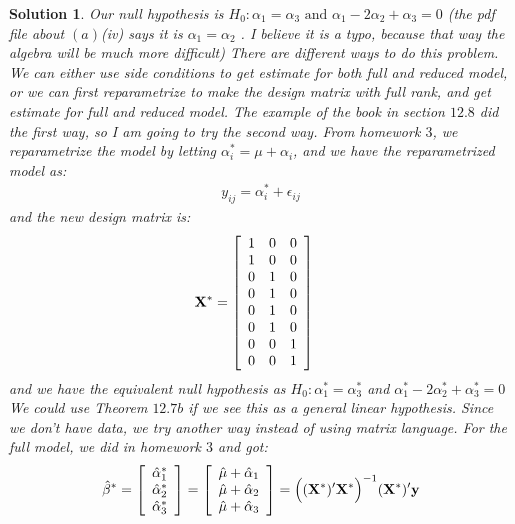\documentclass[11pt]{article}
\newtheorem{sol}{Solution}
\begin{document}
\begin{sol}
	Our null hypothesis is $H_0: \alpha_1 = \alpha_3 \text{ and }\alpha_1 - 2\alpha_2 + \alpha_3= 0$ (the pdf file about $(a)$(iv) says it is $\alpha_1 = \alpha_2$ . I believe it is a typo, because that way the algebra will be much more difficult)\vskip 2mm
	There are different ways to do this problem. We can either use side conditions to get estimate for both full and reduced model, or we can first reparametrize to make the design matrix with full rank, and get estimate for full and reduced model.\vskip 2mm
	The example of the book in section $12.8$ did the first way, so I am going to try the second way.\vskip 2mm
	From homework $3$, we reparametrize the model by letting $\alpha_i^{\ast} = \mu + \alpha_i$, and we have the reparametrized model as:
	\begin{align*}
		y_{ij} = \alpha_i^{\ast} + \epsilon_{ij}
	\end{align*}
	and the new design matrix is:
	\begin{align*}
		{\bf X}^{\ast} &= \left[\begin{array}{ccc} 1&0&0\\ 1&0&0\\ 0&1&0\\ 0&1&0\\ 0&1&0\\ 0&1&0\\ 0&0&1\\ 0&0&1\end{array}\right]
	\end{align*}
	and we have the equivalent null hypothesis as $H_0: \alpha_1^{\ast} = \alpha_3^{\ast}$ and $\alpha_1^{\ast} - 2\alpha_2^{\ast} + \alpha_3^{\ast} = 0$\vskip 2mm
	We could use  Theorem $12.7b$ if we see this as a general linear hypothesis. Since we don't have data, we try another way instead of using matrix language.\vskip 2mm
	For the full model, we did in homework $3$ and got:
	\begin{align*}
		\hat{\beta}^{\ast} &= \left[\begin{array}{c} \hat{\alpha}^{\ast}_1\\ \hat{\alpha}^{\ast}_2\\ \hat{\alpha}^{\ast}_3\end{array}\right]
		= \left[\begin{array}{c} \hat{\mu} +  \hat{\alpha}_1\\ \hat{\mu} + \hat{\alpha}_2\\ \hat{\mu} + \hat{\alpha}_3\end{array}\right] = \Big(({\bf X}^{\ast})'{\bf X}^{\ast}\Big)^{-1}({\bf X}^{\ast})'{\bf y}\\

\end{align*}
\end{sol}
\end{document}
